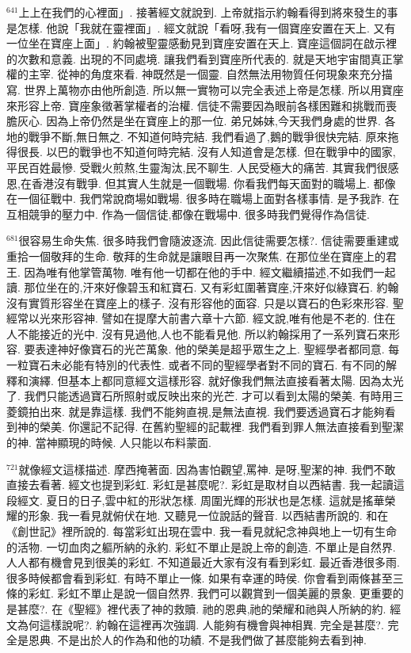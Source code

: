 \documentclass{book}
\begin{document}
$^{641}$上上在我們的心裡面」.
接著經文就說到.
上帝就指示約翰看得到將來發生的事是怎樣.
他說「我就在靈裡面」.
經文就說「看呀,我有一個寶座安置在天上.
又有一位坐在寶座上面」.
約翰被聖靈感動見到寶座安置在天上.
寶座這個詞在啟示裡的次數和意義.
出現的不同處境.
讓我們看到寶座所代表的.
就是天地宇宙間真正掌權的主宰.
從神的角度來看.
神既然是一個靈.
自然無法用物質任何現象來充分描寫.
世界上萬物亦由他所創造.
所以無一實物可以完全表述上帝是怎樣.
所以用寶座來形容上帝.
寶座象徵著掌權者的治權.
信徒不需要因為眼前各樣困難和挑戰而喪膽灰心.
因為上帝仍然是坐在寶座上的那一位.
弟兄姊妹,今天我們身處的世界.
各地的戰爭不斷,無日無之.
不知道何時完結.
我們看過了,鵝的戰爭很快完結.
原來拖得很長.
以巴的戰爭也不知道何時完結.
沒有人知道會是怎樣.
但在戰爭中的國家,平民百姓最慘.
受戰火煎熬,生靈淘汰,民不聊生.
人民受極大的痛苦.
其實我們很感恩,在香港沒有戰爭.
但其實人生就是一個戰場.
你看我們每天面對的職場上.
都像在一個征戰中.
我們常說商場如戰場.
很多時在職場上面對各樣事情.
是予我詐.
在互相競爭的壓力中.
作為一個信徒,都像在戰場中.
很多時我們覺得作為信徒.

$^{681}$很容易生命失焦.
很多時我們會隨波逐流.
因此信徒需要怎樣?.
信徒需要重建或重拾一個敬拜的生命.
敬拜的生命就是讓眼目再一次聚焦.
在那位坐在寶座上的君王.
因為唯有他掌管萬物.
唯有他一切都在他的手中.
經文繼續描述,不如我們一起讀.
那位坐在的,汗來好像碧玉和紅寶石.
又有彩虹圍著寶座,汗來好似綠寶石.
約翰沒有實質形容坐在寶座上的樣子.
沒有形容他的面容.
只是以寶石的色彩來形容.
聖經常以光來形容神.
譬如在提摩大前書六章十六節.
經文說,唯有他是不老的.
住在人不能接近的光中.
沒有見過他,人也不能看見他.
所以約翰採用了一系列寶石來形容.
要表達神好像寶石的光芒萬象.
他的榮美是超乎眾生之上.
聖經學者都同意.
每一粒寶石未必能有特別的代表性.
或者不同的聖經學者對不同的寶石.
有不同的解釋和演繹.
但基本上都同意經文這樣形容.
就好像我們無法直接看著太陽.
因為太光了.
我們只能透過寶石所照射或反映出來的光芒.
才可以看到太陽的榮美.
有時用三菱鏡拍出來.
就是靠這樣.
我們不能夠直視,是無法直視.
我們要透過寶石才能夠看到神的榮美.
你還記不記得.
在舊約聖經的記載裡.
我們看到罪人無法直接看到聖潔的神.
當神顯現的時候.
人只能以布料蒙面.

$^{721}$就像經文這樣描述.
摩西掩著面.
因為害怕觀望,罵神.
是呀,聖潔的神.
我們不敢直接去看著.
經文也提到彩虹.
彩虹是甚麼呢?.
彩虹是取材自以西結書.
我一起讀這段經文.
夏日的日子,雲中紅的形狀怎樣.
周圍光輝的形狀也是怎樣.
這就是搖華榮耀的形象.
我一看見就俯伏在地.
又聽見一位說話的聲音.
以西結書所說的.
和在《創世記》裡所說的.
每當彩虹出現在雲中.
我一看見就紀念神與地上一切有生命的活物.
一切血肉之軀所納的永約.
彩虹不單止是說上帝的創造.
不單止是自然界.
人人都有機會見到很美的彩虹.
不知道最近大家有沒有看到彩虹.
最近香港很多雨.
很多時候都會看到彩虹.
有時不單止一條.
如果有幸運的時侯.
你會看到兩條甚至三條的彩虹.
彩虹不單止是說一個自然界.
我們可以觀賞到一個美麗的景象.
更重要的是甚麼?.
在《聖經》裡代表了神的救贖.
祂的恩典,祂的榮耀和祂與人所納的約.
經文為何這樣說呢?.
約翰在這裡再次強調.
人能夠有機會與神相異.
完全是甚麼?.
完全是恩典.
不是出於人的作為和他的功績.
不是我們做了甚麼能夠去看到神.
\end{document}
